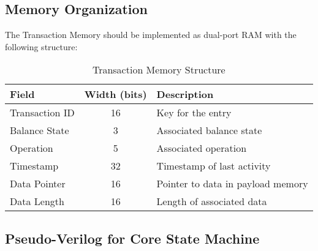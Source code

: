 \documentclass[../../../OAE-SPEC-MAIN.tex]{subfiles}
\begin{document}
\subsection{Memory Organization}

The Transaction Memory should be implemented as dual-port RAM with the following structure:

\begin{table}[h]
\centering
\begin{tabular}{|l|c|l|}
\hline
\textbf{Field} & \textbf{Width (bits)} & \textbf{Description} \\
\hline
Transaction ID & 16 & Key for the entry \\
Balance State & 3 & Associated balance state \\
Operation & 5 & Associated operation \\
Timestamp & 32 & Timestamp of last activity \\
Data Pointer & 16 & Pointer to data in payload memory \\
Data Length & 16 & Length of associated data \\
\hline
\end{tabular}
\caption{Transaction Memory Structure}
\end{table}

\subsection{Pseudo-Verilog for Core State Machine}
\end{document}

